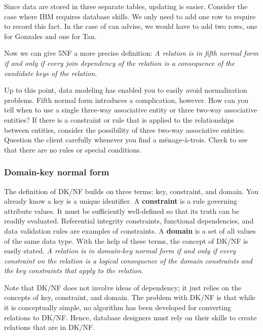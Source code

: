 \documentclass[
]{article}
\begin{document}
Since data are stored in three separate tables, updating is easier.
Consider the case where IBM requires database skills. We only need to
add one row to require to record this fact. In the case of can advise,
we would have to add two rows, one for Gonzales and one for Tan.

Now we can give 5NF a more precise definition: \emph{A relation is in fifth
normal form if and only if every join dependency of the relation is a
consequence of the candidate keys of the relation.}

Up to this point, data modeling has enabled you to easily avoid
normalization problems. Fifth normal form introduces a complication,
however. How can you tell when to use a single three-way associative
entity or three two-way associative entities? If there is a constraint
or rule that is applied to the relationships between entities, consider
the possibility of three two-way associative entities. Question the
client carefully whenever you find a ménage-à-trois. Check to see that
there are no rules or special conditions.

\hypertarget{domain-key-normal-form}{%
\subsubsection*{Domain-key normal form}\label{domain-key-normal-form}}

The definition of DK/NF builds on three terms: key, constraint, and
domain. You already know a key is a unique identifier. A \textbf{constraint}
is a rule governing attribute values. It must be sufficiently
well-defined so that its truth can be readily evaluated. Referential
integrity constraints, functional dependencies, and data validation
rules are examples of constraints. A \textbf{domain} is a set of all values
of the same data type. With the help of these terms, the concept of
DK/NF is easily stated. \emph{A relation is in domain-key normal form if and
only if every constraint on the relation is a logical consequence of the
domain constraints and the key constraints that apply to the relation}.

Note that DK/NF does not involve ideas of dependency; it just relies on
the concepts of key, constraint, and domain. The problem with DK/NF is
that while it is conceptually simple, no algorithm has been developed
for converting relations to DK/NF. Hence, database designers must rely
on their skills to create relations that are in DK/NF.
\end{document}

